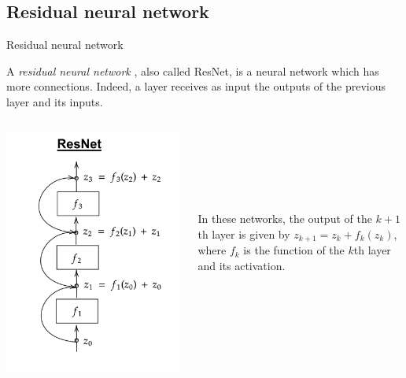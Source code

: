 \documentclass[11pt]{beamer}
\begin{document}
\subsection{Residual neural network} \label{rnn}
\begin{frame}{Residual neural network}

A\textit{ residual neural network} \cite{6}, also called ResNet, is a neural network which has more connections. Indeed, a layer receives as input the outputs of the previous layer and its inputs.

 \begin{columns}[t]
  \begin{column}{5cm}
\begin{center}
\includegraphics[scale=0.14]{resnet.png}
\end{center}
  \end{column}
  
  \begin{column}{5cm}
  \begin{center}
  ~
  
  ~
  
  ~
  
  
  In these networks, the output of the $k+1$th layer is given by
$
z_{k+1} = z_k + f_k(z_k)
$,
where $f_k$ is the function of the $k$th layer and its activation. 
  \end{center}

  \end{column}
 \end{columns} 
\end{frame}
\end{document}
